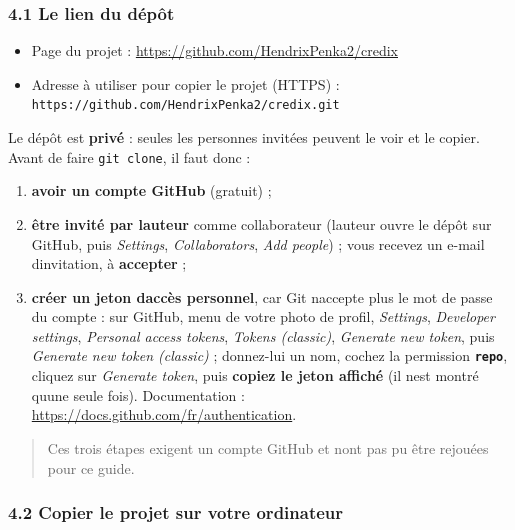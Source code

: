 \documentclass[
  french,
  11pt,
  a4paper,
]{article}
\providecommand{\tightlist}{%
  \setlength{\itemsep}{0pt}\setlength{\parskip}{0pt}}
\begin{document}
\subsubsection{4.1 Le lien du dépôt}\label{41-le-lien-du-duxe9puxf4t}

\begin{itemize}
\tightlist
\item
  Page du projet : \url{https://github.com/HendrixPenka2/credix}
\item
  Adresse à utiliser pour copier le projet (HTTPS) :
  \texttt{https:/\allowbreak{}/\allowbreak{}github.\allowbreak{}com/\allowbreak{}HendrixPenka2/\allowbreak{}credix.\allowbreak{}git}
\end{itemize}

Le dépôt est \textbf{privé} : seules les personnes invitées peuvent le
voir et le copier. Avant de faire \texttt{git\ clone}, il faut donc :

\begin{enumerate}
\def\labelenumi{\arabic{enumi}.}
\tightlist
\item
  \textbf{avoir un compte GitHub} (gratuit) ;
\item
  \textbf{être invité par l\textquotesingle auteur} comme collaborateur
  (l\textquotesingle auteur ouvre le dépôt sur GitHub, puis
  \emph{Settings}, \emph{Collaborators}, \emph{Add people}) ; vous
  recevez un e-mail d\textquotesingle invitation, à \textbf{accepter} ;
\item
  \textbf{créer un jeton d\textquotesingle accès personnel}, car Git
  n\textquotesingle accepte plus le mot de passe du compte : sur GitHub,
  menu de votre photo de profil, \emph{Settings}, \emph{Developer
  settings}, \emph{Personal access tokens}, \emph{Tokens (classic)},
  \emph{Generate new token}, puis \emph{Generate new token (classic)} ;
  donnez-lui un nom, cochez la permission \textbf{\texttt{repo}},
  cliquez sur \emph{Generate token}, puis \textbf{copiez le jeton
  affiché} (il n\textquotesingle est montré qu\textquotesingle une seule
  fois). Documentation :
  \url{https://docs.github.com/fr/authentication}.
\end{enumerate}

\begin{quote}
Ces trois étapes exigent un compte GitHub et n\textquotesingle ont pas
pu être rejouées pour ce guide.
\end{quote}

\subsubsection{4.2 Copier le projet sur votre
ordinateur}\label{42-copier-le-projet-sur-votre-ordinateur}
\end{document}
